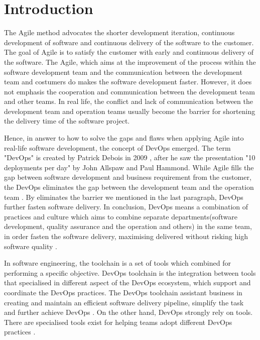 \chapter{Introduction}
\label{chp:introduction}
The Agile method advocates the shorter development iteration, continuous development of software and continuous delivery of the software to the customer. The goal \cite{beck2001manifesto} of Agile is to satisfy the customer with early and continuous delivery of the software.
The Agile, which aims at the improvement of the process within the software development team and the communication between the development team and costumers \cite{miglierina2014application} do makes the software development faster. However, it does not emphasis the cooperation and communication between the development team and other teams. In real life, the conflict and lack of communication between the development team and operation teams usually become the barrier for shortening the delivery time of the software project.
\par
Hence, in answer to how to solve the gaps and flaws when applying Agile into real-life software development, the concept of DevOps emerged. The term "DevOps" is created by Patrick Debois in 2009 \cite{kim2016devops}, after he saw the presentation "10 deployments per day" by John Allspaw and Paul Hammond. While Agile fills the gap between software development and business requirement from the customer, the DevOps eliminates the gap between the development team and the operation team \cite{WhatisaD20:online}. By eliminates the barrier we mentioned in the last paragraph, DevOps further fasten software delivery. In conclusion, DevOps means a combination of practices and culture which aims to combine separate departments(software development, quality assurance and the operation and others) in the same team, in order fasten the software delivery, maximising delivered without risking high software quality \cite{DevOpsWi87:online}\cite{ebert2016devops}.
\par
In software engineering, the toolchain is a set of tools which combined for performing a specific objective. DevOps toolchain is the integration between tools that specialised in different aspect of the DevOps ecosystem, which support and coordinate the DevOps practices. The DevOps toolchain assistant business in creating and maintain an efficient software delivery pipeline, simplify the task and further achieve DevOps \cite{DevOpsto7:online}. On the other hand, DevOps strongly rely on tools. There are specialised tools exist for helping teams adopt different DevOps practices \cite{zhu2016devops}. 
